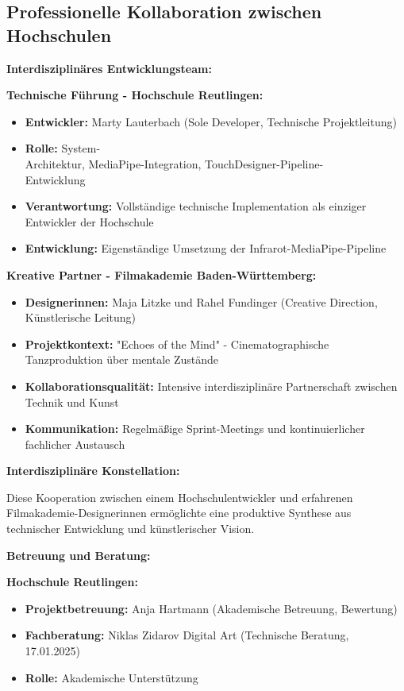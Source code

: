 \subsection{Professionelle Kollaboration zwischen Hochschulen}

\textbf{Interdisziplinäres Entwicklungsteam:}

\textbf{Technische Führung - Hochschule Reutlingen:}
\begin{itemize}
    \item \textbf{Entwickler:} Marty Lauterbach (Sole Developer, Technische Projektleitung)
    \item \textbf{Rolle:} System-\\Architektur, MediaPipe-Integration, TouchDesigner-Pipeline-\\Entwicklung
    \item \textbf{Verantwortung:} Vollständige technische Implementation als einziger Entwickler der Hochschule
    \item \textbf{Entwicklung:} Eigenständige Umsetzung der Infrarot-MediaPipe-Pipeline
\end{itemize}

\textbf{Kreative Partner - Filmakademie Baden-Württemberg:}
\begin{itemize}
    \item \textbf{Designerinnen:} Maja Litzke und Rahel Fundinger (Creative Direction, Künstlerische Leitung)
    \item \textbf{Projektkontext:} "Echoes of the Mind" - Cinematographische Tanzproduktion über mentale Zustände
    \item \textbf{Kollaborationsqualität:} Intensive interdisziplinäre Partnerschaft zwischen Technik und Kunst
    \item \textbf{Kommunikation:} Regelmäßige Sprint-Meetings und kontinuierlicher fachlicher Austausch
\end{itemize}

\textbf{Interdisziplinäre Konstellation:}
\raggedright Diese Kooperation zwischen einem Hochschulentwickler und erfahrenen Filmakademie-Designerinnen ermöglichte eine produktive Synthese aus technischer Entwicklung und künstlerischer Vision.

\textbf{Betreuung und Beratung:}

\textbf{Hochschule Reutlingen:}
\begin{itemize}
    \item \textbf{Projektbetreuung:} Anja Hartmann (Akademische Betreuung, Bewertung)
    \item \textbf{Fachberatung:} Niklas Zidarov Digital Art (Technische Beratung, 17.01.2025)
    \item \textbf{Rolle:} Akademische Unterstützung
\end{itemize}

